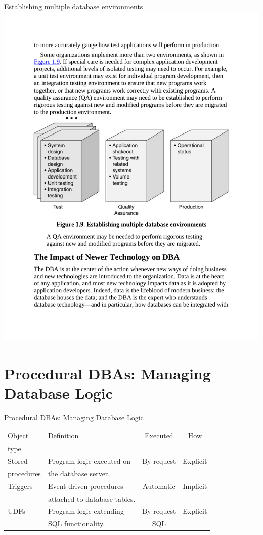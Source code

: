 \documentclass{beamer}
\begin{document}
\begin{frame}{Establishing multiple database environments}
    \centering
    \includegraphics[width=\textwidth, trim={2.50cm 10.20cm 2.50cm 9.40cm}, clip]{figures/dba_test}
\end{frame}

\section{Procedural DBAs: Managing Database Logic}

\begin{frame}{Procedural DBAs: Managing Database Logic}
    \small
    \centering
    \begin{tabular}{ l l c c}
        \toprule
        Object & Definition & Executed & How \\
        type & & & \\
        \midrule
        Stored  & Program logic executed on & By request & Explicit \\
        procedures & the database server. & & \\
        Triggers & Event-driven procedures & Automatic & Implicit \\
        & attached to database tables. & & \\
        UDFs & Program logic extending & By request & Explicit \\
        & SQL functionality. & SQL & \\
        \bottomrule
    \end{tabular}
\end{frame}
\end{document}
